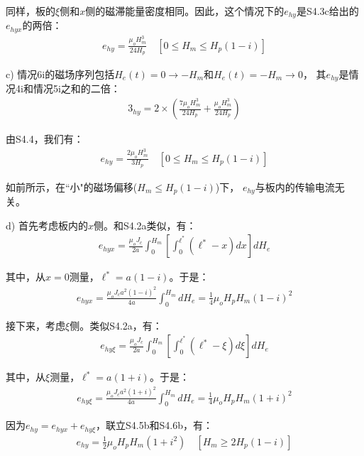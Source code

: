 同样，板的$\xi$侧和$x$侧的磁滞能量密度相同。因此，这个情况下的$e_{hy}$是S4.3c给出的$e_{hyx}$的两倍：
\begin{align*}%
e_{hy}=\frac{\mu_oH_{m}^{3}}{24H_p}   \quad     [0\leq H_m\leq H_p(1-i)] \tag{7.22b}
\end{align*}

c) 情况6i的磁场序列包括$H_e(t)=0\rightarrow -H_m$和$H_e(t)=-H_m\rightarrow 0$，
其$e_{hy}$是情况4i和情况5i之和的二倍：
\begin{align*}%
3_{hy}=2\times\left(\frac{7\mu_oH_{m}^{3}}{24H_p}+\frac{\mu_oH_{m}^{3}}{24H_p}\right) \tag{S4.4}
\end{align*}

由S4.4，我们有：
\begin{align*}%
e_{hy}=\frac{2\mu_oH_{m}^{3}}{3H_p} \quad [0\leq H_m\leq H_p(1-i)] \tag{7.22c}
\end{align*}

如前所示，在``小"的磁场偏移($H_m\le H_p(1-i)$)下，
$e_{hy}$与板内的传输电流无关。

d) 首先考虑板内的$x$侧。和S4.2a类似，有：
\begin{align*}%
e_{hyx}=\frac{\mu_oJ_c}{2a}\int_{0}^{H_m}\left[\int_{0}^{\ell^*}(\ell^*-x)dx\right]dH_e \tag{4.5a}
\end{align*}

其中，从$x=0$测量，$\ell^*=a(1-i)$。于是：
\begin{align*}%
e_{hyx}=\frac{\mu_oJ_ca^2(1-i)^2}{4a}\int_{0}^{H_m}dH_e=\frac{1}{4}\mu_oH_pH_m(1-i)^2 \tag{S4.5b}
\end{align*}

接下来，考虑$\xi$侧。类似S4.2a，有：
\begin{align*}%
e_{hy\xi}=\frac{\mu_oJ_c}{2a}\int_{0}^{H_m}\left[\int_{0}^{\ell^*}(\ell^*-\xi)d\xi\right]dH_e \tag{S4.6a}
\end{align*}

其中，从$\xi$测量，$\ell^*=a(1+i)$。于是：
\begin{align*}%
e_{hy\xi}=\frac{\mu_oJ_ca^2(1+i)^2}{4a}\int_{0}^{H_m}dH_e=\frac{1}{4}\mu_oH_pH_m(1+i)^2\tag{S4.6b}
\end{align*}

因为$e_{hy}=e_{hyx}+e_{hy\xi}$，联立S4.5b和S4.6b，有：
\begin{align*}%
e_{hy}=\frac{1}{2}\mu_oH_pH_m(1+i^2) \quad [H_m\geq 2H_p(1-i)] \tag{7.23a}
\end{align*}

